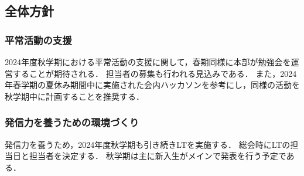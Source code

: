 \subsection*{全体方針}


\subsubsection*{平常活動の支援}
2024年度秋学期における平常活動の支援に関して，春期同様に本部が勉強会を運営することが期待される．
担当者の募集も行われる見込みである．
また，2024年春学期の夏休み期間中に実施された会内ハッカソンを参考にし，同様の活動を秋学期中に計画することを推奨する．

\subsubsection*{発信力を養うための環境づくり}
発信力を養うため，2024年度秋学期も引き続きLTを実施する．
総会時にLTの担当日と担当者を決定する．
秋学期は主に新入生がメインで発表を行う予定である．
